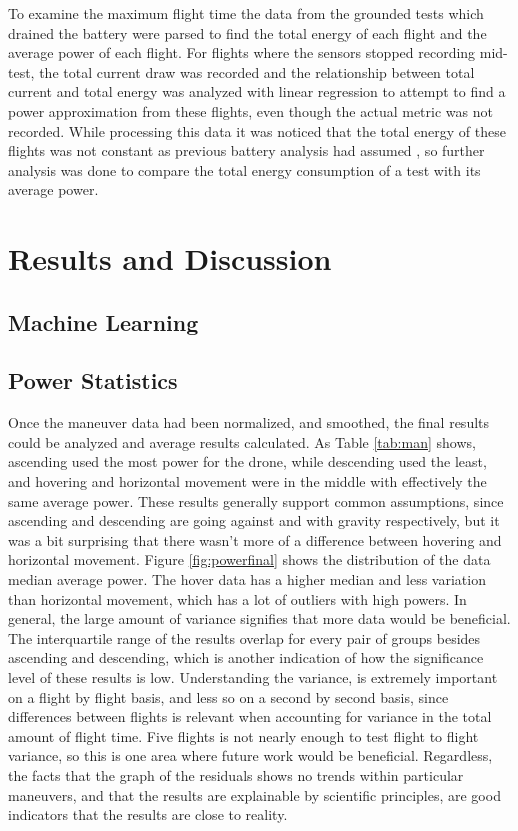 \documentclass{article}
\begin{document}
To examine the maximum flight time the data from the grounded tests which drained the battery were parsed to find the total energy of each flight and the average power of each flight. For flights where the  sensors stopped recording mid-test, the total current draw was recorded and the relationship between total current and total energy was analyzed with linear regression to attempt to find a power approximation from these flights, even though the actual metric was not recorded. While processing this data it was noticed that the total energy of these flights was not constant as previous battery analysis had assumed \cite{Prasetia}, so further analysis was done to compare the total energy consumption of a test with its average power.


\section{Results and Discussion}
\subsection{Machine Learning}


\subsection{Power Statistics}

Once the maneuver data had been normalized, and smoothed, the final results could be analyzed and average results calculated. As Table \ref{tab:man} shows, ascending used the most power for the drone, while descending used the least, and hovering and horizontal movement were in the middle with effectively the same average power. These results generally support common assumptions, since ascending and descending are going against and with gravity respectively, but it was a bit surprising that there wasn't more of a difference between hovering and horizontal movement. Figure \ref{fig:powerfinal} shows the distribution of the data median average power. The hover data has a higher median and less variation than horizontal movement, which has a lot of outliers with high powers. In general, the large amount of variance signifies that more data would be beneficial. The interquartile range of the results overlap for every pair of groups besides ascending and descending, which is another indication of how the significance level of these results is low. Understanding the variance, is extremely important on a flight by flight basis, and less so on a second by second basis, since differences between flights is relevant when accounting for variance in the total amount of flight time. Five flights is not nearly enough to test flight to flight variance, so this is one area where future work would be beneficial. Regardless, the facts that the graph of the residuals shows no trends within particular maneuvers, and that the results are explainable by scientific principles, are good indicators that the results are close to reality. 
\end{document}
